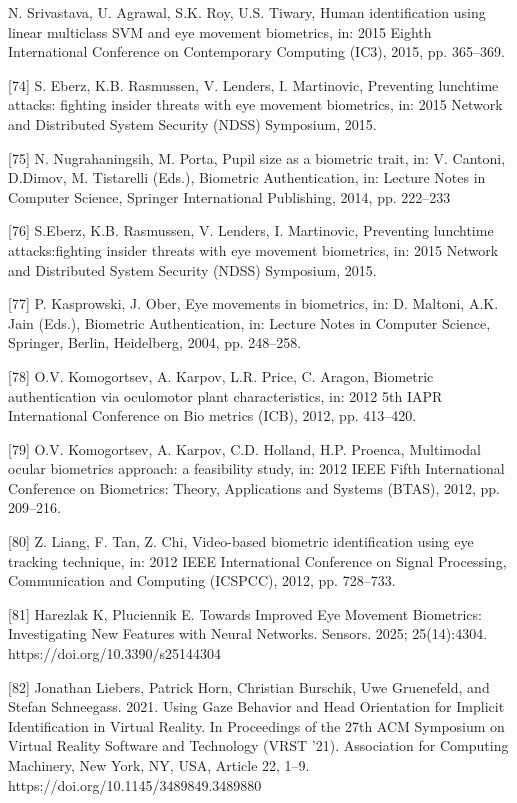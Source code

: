 \documentclass{article}
\begin{document}
\begin{raggedright}
[73] N. Srivastava, U. Agrawal, S.K. Roy, U.S. Tiwary, Human identification using linear multiclass SVM and eye movement biometrics, in: 2015 Eighth International Conference on Contemporary Computing (IC3), 2015, pp. 365–369.

[74] S. Eberz, K.B. Rasmussen, V. Lenders, I. Martinovic, Preventing lunchtime attacks: fighting insider threats with eye movement biometrics, in: 2015 Network and Distributed System Security (NDSS) Symposium, 2015.

[75] N. Nugrahaningsih, M. Porta, Pupil size as a biometric trait, in: V. Cantoni, D.Dimov, M. Tistarelli (Eds.), Biometric Authentication, in: Lecture Notes in Computer Science, Springer International Publishing, 2014, pp. 222–233

[76] S.Eberz, K.B. Rasmussen, V. Lenders, I. Martinovic, Preventing lunchtime attacks:fighting insider threats with eye movement biometrics, in: 2015 Network and Distributed System Security (NDSS) Symposium, 2015.

[77] P. Kasprowski, J. Ober, Eye movements in biometrics, in: D. Maltoni, A.K. Jain (Eds.), Biometric Authentication, in: Lecture Notes in Computer Science, Springer, Berlin, Heidelberg, 2004, pp. 248–258.

[78] O.V. Komogortsev, A. Karpov, L.R. Price, C. Aragon, Biometric authentication via oculomotor plant characteristics, in: 2012 5th IAPR International Conference on Bio metrics (ICB), 2012, pp. 413–420.

[79] O.V. Komogortsev, A. Karpov, C.D. Holland, H.P. Proenca, Multimodal ocular biometrics approach: a feasibility study, in: 2012 IEEE Fifth International Conference on Biometrics: Theory, Applications and Systems (BTAS), 2012, pp. 209–216.

[80] Z. Liang, F. Tan, Z. Chi, Video-based biometric identification using eye tracking technique, in: 2012 IEEE International Conference on Signal Processing, Communication and Computing (ICSPCC), 2012, pp. 728–733.

[81] Harezlak K, Pluciennik E. Towards Improved Eye Movement Biometrics: Investigating New Features with Neural Networks. Sensors. 2025; 25(14):4304. https://doi.org/10.3390/s25144304

[82] Jonathan Liebers, Patrick Horn, Christian Burschik, Uwe Gruenefeld, and Stefan Schneegass. 2021. Using Gaze Behavior and Head Orientation for Implicit Identification in Virtual Reality. In Proceedings of the 27th ACM Symposium on Virtual Reality Software and Technology (VRST '21). Association for Computing Machinery, New York, NY, USA, Article 22, 1–9. https://doi.org/10.1145/3489849.3489880


\end{raggedright}
\end{document}
